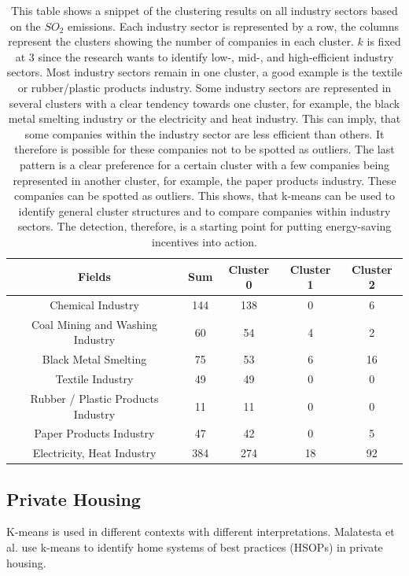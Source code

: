 \begin{table}[h]
    \centering
    \begin{tabular}{|c|c|c|c|c|}
        \hline
        \textbf{Fields} & \textbf{Sum} & \textbf{Cluster 0} & \textbf{Cluster 1} & \textbf{Cluster 2} \\
        \hline
        Chemical Industry & 144 & 138 & 0 & 6 \\
        Coal Mining and Washing Industry & 60 & 54 & 4 & 2 \\
        Black Metal Smelting & 75 & 53 & 6 & 16 \\
        Textile Industry & 49 & 49 & 0 & 0 \\
        Rubber / Plastic Products Industry & 11 & 11 & 0 & 0 \\
        Paper Products Industry & 47 & 42 & 0 & 5 \\
        Electricity, Heat Industry & 384 & 274 & 18 & 92 \\
        \hline
    \end{tabular}
    \caption{This table shows a snippet of the clustering results on all industry sectors based on the $SO_2$ emissions.
    Each industry sector is represented by a row, the columns represent the clusters showing the number of companies in each cluster.
    $k$ is fixed at $3$ since the research wants to identify low-, mid-, and high-efficient industry sectors.
    Most industry sectors remain in one cluster, a good example is the textile or rubber/plastic products industry.
    Some industry sectors are represented in several clusters with a clear tendency towards one cluster, for example, the black metal smelting industry or the electricity and heat industry.
    This can imply, that some companies within the industry sector are less efficient than others.
    It therefore is possible for these companies not to be spotted as outliers.
    The last pattern is a clear preference for a certain cluster with a few companies being represented in another cluster, for example, the paper products industry.
    These companies can be spotted as outliers.
    This shows, that k-means can be used to identify general cluster structures and to compare companies within industry sectors.
    The detection, therefore, is a starting point for putting energy-saving incentives into action.
    }
    \label{tab:multi_industries_clustering_results_based_on_the_so2_emission}
\end{table}

\subsection{Private Housing}
K-means is used in different contexts with different interpretations.
Malatesta et al. \cite{MAL-HBP} use k-means to identify home systems of best practices (HSOPs) in private housing.

